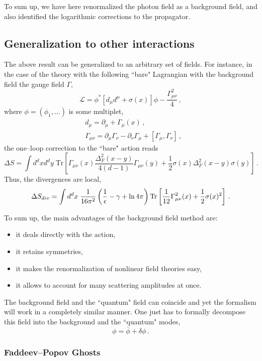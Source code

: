 \documentclass[11pt,a4paper]{article}
\newcommand{\be}{\begin{equation}}
\newcommand{\ee}{\end{equation}}
\newcommand\m{\mu}
\newcommand\g{\gamma}
\newcommand\G{\Gamma}
\newcommand\n{\nu}
\def\d{\partial}
\renewcommand{\ln}{\mathop{\rm ln}\nolimits}
\begin{document}
To sum up, we have here renormalized the photon field as a background field, and also identified the logarithmic corrections to the propagator.

\subsection{Generalization to other interactions}

The above result can be generalized to an arbitrary set of fields.
For instance, in the case of the theory with the following ``bare" Lagrangian with the background field the
gauge field $\G$,
\be
\label{eq:bfgen}
\mathcal{L}=\phi^*[d_\m d^\m+\sigma(x)]\phi -\frac{\Gamma_{\m\n}^2}{4} \,,
\ee
where $\phi=(\phi_1,...)$ is some multiplet,
\be
\label{eq:bfgen2}
\begin{split}
& d_\mu=\d_\mu +\Gamma_\mu (x)\,,\\
& \Gamma_{\m \n} =\d_\m \Gamma_\n-\d_\n \G_\m +\left[\G_\m,\G_\n \right]\,,
\end{split}
\ee
the one--loop correction to the ``bare" action reads
\be
\label{eq:bfgen3}
\Delta S=\int d^dx d^dy \; \text{Tr}\left[
\G_{\m \n}(x)\frac{\Delta_F^2(x-y)}{4(d-1)}\G_{\m \n}(y)+\frac{1}{2}\sigma(x)\Delta_F^2(x-y)\sigma(y)
\right] \,.
\ee
Thus, the divergences are local,
\be
\label{eq:bfgen4}
\Delta S_{div}=\int d^dx \; \frac{1}{16\pi^2}\left(\frac{1}{\epsilon}
-\g+\ln 4\pi
\right)\text{Tr}\left[
\frac{1}{12}\G_{\m \n}^2(x)+\frac{1}{2}\sigma(x)^2
\right] \,.
\ee

To sum up, the main advantages of the background field method are:
\begin{itemize}
\item it deals directly with the action,
\item it retains symmetries,
\item it makes the renormalization of nonlinear field theories easy,
\item it allows to account for many scattering amplitudes at once.
\end{itemize}

The background field and the ``quantum"
field can coincide and yet the formalism will work in a completely
similar manner. One just has to formally decompose this field into the background
and the ``quantum" modes,
\be
\phi=\bar \phi+\delta \phi\,.
\ee



\subsubsection{Faddeev--Popov Ghosts}
\end{document}
